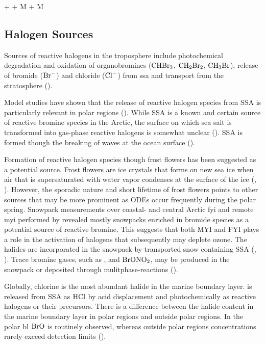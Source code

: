 \begin{reaction}
     +  + M \rightarrow {} + M
    \label{R:clono2}
\end{reaction}

\subsection{Halogen Sources}\label{sec:halogen_sources}

Sources of reactive halogens in the troposphere include photochemical degradation and oxidation of organobromines ($\mathrm{CHBr_3}$, $\mathrm{CH_2Br_2}$, $\mathrm{CH_3Br}$), release of bromide ($\mathrm{Br^-}$) and chloride ($\mathrm{Cl^-}$) from \acrfull{ssa} and transport from the stratosphere (\cite{Schmidt}). 

\medskip

Model studies have shown that the release of reactive halogen species from SSA is particularly relevant in polar regions (\cite{Schmidt}). While SSA is a known and certain source of reactive bromine species in the Arctic, the surface on which sea salt is transformed into gas-phase reactive halogens is somewhat unclear (\cite{Simpson2005}). SSA is formed though the breaking of waves at the ocean surface (\cite{Simpson2015}). 

\medskip

Formation of reactive halogen species though frost flowers has been suggested as a potential source. Frost flowers are ice crystals that forms on new sea ice when air that is supersaturated with water vapor condenses at the surface of the ice (\cite{GRANFORS2013124}, \cite{Kaleschke}). However, the sporadic nature and short lifetime of frost flowers points to other sources that may be more prominent as ODEs occur frequently during the polar spring. Snowpack measurements over coastal- and central Arctic \acrfull{fyi} and remote \acrfull{myi} performed by \cite{Peterson2019} revealed mostly snowpacks enriched in bromide species as a potential source of reactive bromine. This suggests that both MYI and FYI plays a role in the activation of halogens that subsequently may deplete ozone. The halides are incorporated in the snowpack by transported snow containing SSA (\cite{Toyota}, \cite{Peterson2019}). Trace bromine gases, such as ,  and $\mathrm{BrONO_2}$, may be produced in the snowpack or deposited through mulitphase-reactions (\cite{Simpson2005}). 


\medskip


Globally, chlorine is the most abundant halide in the marine boundary layer.  is released from SSA as $\mathrm{HCl}$ by acid displacement and photochemically as reactive halogens or their precursors. There is a difference between the halide content in the marine boundary layer in polar regions and outside polar regions. In the polar \acrfull{bl} $\mathrm{BrO}$ is routinely observed, whereas outside polar regions  concentrations rarely exceed detection limits (\cite{Simpson2015}). 


